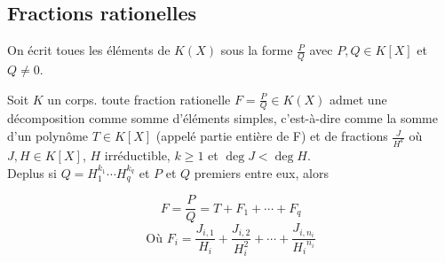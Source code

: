 \subsection{Fractions rationelles}

\begin{definition}
	On écrit toues les éléments de $K(X)$ sous la forme $\frac{P}{Q}$ avec $P,Q \in K[X]$ et $Q \neq 0$.
\end{definition}

\begin{theorem}
	Soit $K$ un corps. toute fraction rationelle $F = \frac{P}{Q} \in K(X)$ admet une décomposition comme somme
	d'éléments simples, c'est-à-dire comme la somme d'un polynôme $T \in K[X]$ (appelé partie entière de F) et de fractions
	$\frac{J}{H^k}$ où $J,H \in K[X]$, $H$ irréductible, $k \geq 1$ et $\deg J < \deg H$. \\

	Deplus si $Q = H_1^{k_1} \cdots H_q^{k_q}$ et $P$ et $Q$ premiers entre eux, alors

	$$ F = \frac{P}{Q} = T + F_1 + \cdots + F_q$$
	$$\text{Où } F_i = \frac{J_{i,1}}{H_i} + \frac{J_{i,2}}{H_i^2} + \cdots + \frac{J_{i,n_i}}{{H_i}^{n_i}}$$
\end{theorem}
